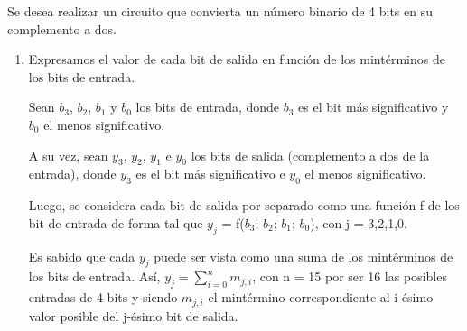 \documentclass[../../informe/src/main.tex]{subfiles}
\begin{document}
Se desea realizar un circuito que convierta un número binario de 4 bits en su complemento a dos.

\begin{enumerate}

\item Expresamos el valor de cada bit de salida en función de los mintérminos de los bits de entrada.\par
Sean $b_{3}$, $b_{2}$, $b_{1}$ y $b_{0}$ los bits de entrada, donde $b_{3}$ es el bit más significativo y $b_{0}$ el menos significativo.\par
A su vez, sean $y_{3}$, $y_{2}$, $y_{1}$ e $y_{0}$ los bits de salida (complemento a dos de la entrada), donde $y_{3}$ es el bit más significativo e $y_{0}$ el menos significativo. \par
Luego, se considera cada bit de salida por separado como una función f de los bit de entrada de forma tal que $y_{j}$ = f($b_{3}$; $b_{2}$; $b_{1}$; $b_{0}$), con j = 3,2,1,0.\par
Es sabido que cada $y_{j}$ puede ser vista como una suma de los mintérminos de los bits de entrada. 
Así, $y_{j} =\sum\limits_{i=0}^n m_{j,i} $, con n = 15 por ser 16 las posibles entradas de 4 bits y siendo $m_{j,i}$ el mintérmino correspondiente al i-ésimo valor posible del j-ésimo bit de salida.\par


\end{enumerate}
\end{document}
